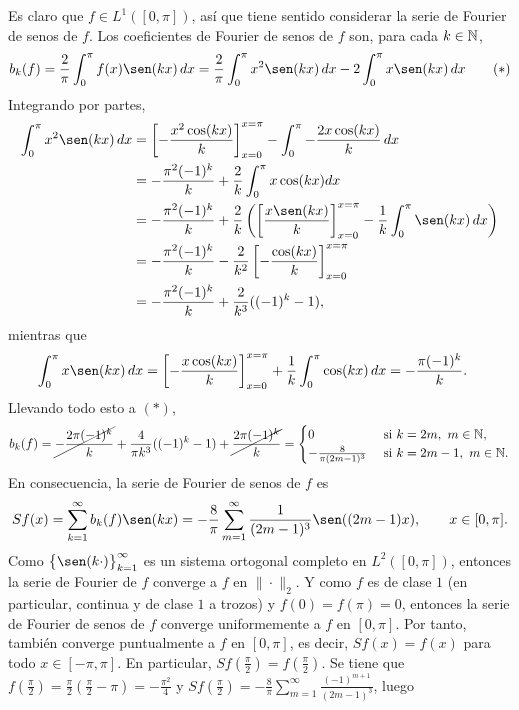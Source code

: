 \documentclass[a4paper, 12pt, extrafontsizes]{memoir}
\begin{document}
\begin{solution}
    Es claro que $f \in L^1([0,\pi])$, así que tiene sentido considerar la serie de Fourier de senos de $f$. Los coeficientes de Fourier de senos de $f$ son, para cada $k \in \mathbb N$,
    \[
        b_k(f) = \frac{2}{\pi}\int_0^\pi f(x)\sen(kx) \, dx = \frac{2}{\pi}\int_0^\pi x^2\sen(kx) \, dx -2\int_0^\pi x\sen(kx) \, dx \tag{$\ast$}
    \]
    Integrando por partes,
    \[\begin{aligned}[t]
        \int_0^\pi x^2\sen(kx) \, dx &= \left[-\frac{x^2\cos(kx)}{k}\right]_{x=0}^{x=\pi}-\int_0^\pi -\frac{2x\cos(kx)}{k}\, dx \\
        &= -\frac{\pi^2(-1)^k}{k} +\frac{2}{k}\int_0^\pi x\cos(kx) dx \\
        &= -\frac{\pi^2(-1)^k}{k} +\frac{2}{k}\left(\left[\frac{x\sen(kx)}{k}\right]_{x=0}^{x=\pi}-\frac{1}{k}\int_0^\pi \sen(kx) \, dx \right) \\
        &= -\frac{\pi^2(-1)^k}{k} -\frac{2}{k^2}\left[-\frac{\cos(kx)}{k}\right]_{x=0}^{x=\pi}\\
        &= -\frac{\pi^2(-1)^k}{k} +\frac{2}{k^3}((-1)^k-1),\\
    \end{aligned}\]
    mientras que
    \[\begin{aligned}[t]
        \int_0^\pi x\sen(kx) \, dx &= \left[-\frac{x\cos(kx)}{k}\right]_{x=0}^{x=\pi} +\frac{1}{k}\int_0^\pi \cos(kx) \, dx = -\frac{\pi(-1)^k}{k}.
    \end{aligned}\]
    Llevando todo esto a $(\ast)$,
    \[\begin{aligned}[t]
        b_k(f) = \cancel{-\frac{2\pi(-1)^k}{k}}+\frac{4}{\pi k^3}((-1)^k-1) +\cancel{\frac{2\pi(-1)^k}{k}} = \begin{cases}
            0 & $ si $ k = 2m, \ m \in \N, \\
            -\frac{8}{\pi (2m-1)^3} & $ si $ k = 2m-1, \ m \in \N.
        \end{cases}
    \end{aligned}\]
    En consecuencia, la serie de Fourier de senos de $f$ es
    \[Sf(x) = \sum_{k=1}^\infty b_k(f) \sen(kx) = -\frac{8}{\pi}\sum_{m=1}^\infty \frac{1}{(2m-1)^3} \sen((2m-1)x), \qquad x \in [0,\pi].\]
    Como $\bigl\{\sen(k \cdot)\bigr\}_{k=1}^\infty$ es un sistema ortogonal completo en $L^2([0,\pi])$, entonces la serie de Fourier de $f$ converge a $f$ en $\|\cdot\|_2$. Y como $f$ es de clase $1$ (en particular, continua y de clase $1$ a trozos) y $f(0) = f(\pi) = 0$, entonces la serie de Fourier de senos de $f$ converge uniformemente a $f$ en $[0,\pi]$. Por tanto, también converge puntualmente a $f$ en $[0,\pi]$, es decir, $Sf(x) = f(x)$ para todo $x \in [-\pi,\pi]$. En particular, $Sf(\frac{\pi}{2}) =  f(\frac{\pi}{2})$. Se tiene que $f(\frac{\pi}{2}) = \frac{\pi}{2}(\frac{\pi}{2}-\pi) = -\frac{\pi^2}{4}$ y $Sf(\frac{\pi}{2}) = -\frac{8}{\pi}\sum_{m=1}^\infty \frac{(-1)^{m+1}}{(2m-1)^3}$, luego

\end{solution}
\end{document}

